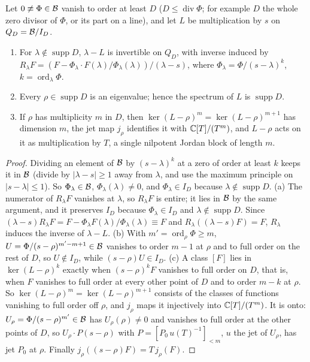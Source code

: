 \begin{proposition}[multiplication by $s$ on $\B/I_D$]\label{prop:spectral-L}
Let $0\not\equiv\Phi\in\mathcal{B}$ vanish to order at least $D$ ($D\le\operatorname{div}\Phi$; for example $D$ the whole zero divisor of $\Phi$, or its part on a line), and let $L$ be multiplication by $s$ on $Q_D=\mathcal{B}/I_D$.
\begin{enumerate}[label=(\alph*)]
\item For $\lambda\notin\operatorname{supp}D$, $\lambda-L$ is invertible on $Q_D$, with inverse induced by $R_\lambda F=(F-\Phi_\lambda\cdot F(\lambda)/\Phi_\lambda(\lambda))/(\lambda-s)$, where $\Phi_\lambda=\Phi/(s-\lambda)^{k}$, $k=\operatorname{ord}_\lambda\Phi$.
\item Every $\rho\in\operatorname{supp}D$ is an eigenvalue; hence the spectrum of $L$ is $\operatorname{supp}D$.
\item If $\rho$ has multiplicity $m$ in $D$, then $\ker(L-\rho)^m=\ker(L-\rho)^{m+1}$ has dimension $m$, the jet map $j_\rho$ identifies it with $\mathbb{C}[T]/(T^m)$, and $L-\rho$ acts on it as multiplication by $T$, a single nilpotent Jordan block of length $m$.
\end{enumerate}
\end{proposition}

\begin{proof}
Dividing an element of $\mathcal{B}$ by $(s-\lambda)^k$ at a zero of order at least $k$ keeps it in $\mathcal{B}$ (divide by $|\lambda-s|\ge1$ away from $\lambda$, and use the maximum principle on $|s-\lambda|\le1$). So $\Phi_\lambda\in\mathcal{B}$, $\Phi_\lambda(\lambda)\ne0$, and $\Phi_\lambda\in I_D$ because $\lambda\notin\operatorname{supp}D$.
(a) The numerator of $R_\lambda F$ vanishes at $\lambda$, so $R_\lambda F$ is entire; it lies in $\mathcal{B}$ by the same argument, and it preserves $I_D$ because $\Phi_\lambda\in I_D$ and $\lambda\notin\operatorname{supp}D$.
Since $(\lambda-s)R_\lambda F=F-\Phi_\lambda F(\lambda)/\Phi_\lambda(\lambda)\equiv F$ and $R_\lambda((\lambda-s)F)=F$, $R_\lambda$ induces the inverse of $\lambda-L$.
(b) With $m'=\operatorname{ord}_\rho\Phi\ge m$, $U=\Phi/(s-\rho)^{m'-m+1}\in\mathcal{B}$ vanishes to order $m-1$ at $\rho$ and to full order on the rest of $D$, so $U\notin I_D$, while $(s-\rho)U\in I_D$.
(c) A class $[F]$ lies in $\ker(L-\rho)^k$ exactly when $(s-\rho)^kF$ vanishes to full order on $D$, that is, when $F$ vanishes to full order at every other point of $D$ and to order $m-k$ at $\rho$. So $\ker(L-\rho)^m=\ker(L-\rho)^{m+1}$ consists of the classes of functions vanishing to full order off $\rho$, and $j_\rho$ maps it injectively into $\mathbb{C}[T]/(T^m)$.
It is onto: $U_\rho=\Phi/(s-\rho)^{m'}\in\mathcal{B}$ has $U_\rho(\rho)\ne0$ and vanishes to full order at the other points of $D$, so $U_\rho\cdot P(s-\rho)$ with $P=[P_0\,u(T)^{-1}]_{<m}$, $u$ the jet of $U_\rho$, has jet $P_0$ at $\rho$.
Finally $j_\rho((s-\rho)F)=T\,j_\rho(F)$.
\end{proof}

